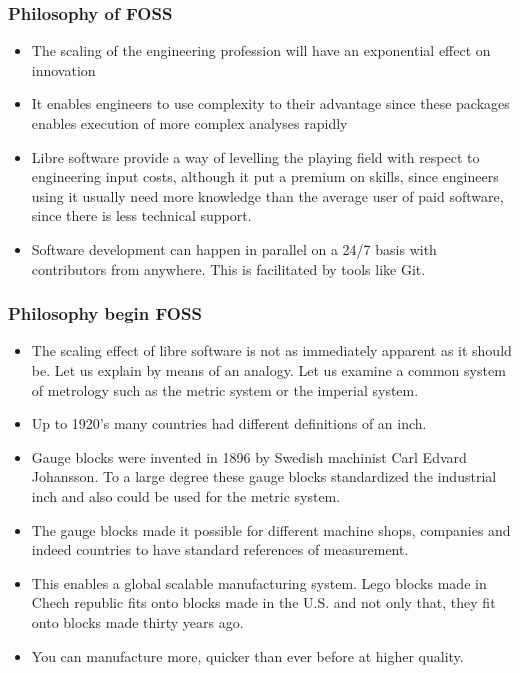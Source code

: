 \documentclass{beamer}
\begin{document}
\begin{frame}
\frametitle{Philosophy of FOSS}

\begin{itemize}
\item The scaling of the engineering profession will have an exponential effect on innovation
\item It enables engineers to use complexity to their advantage since these packages enables execution of more complex analyses rapidly
\item Libre software provide a way of levelling the playing field with respect to engineering input costs, although it put a premium on skills, since engineers using it usually need more knowledge than the average user of paid software, since there is less technical support.
\item Software development can happen in parallel on a 24/7 basis with contributors from anywhere.  This is facilitated by tools like Git.
\end{itemize}

\end{frame}




\begin{frame}
\frametitle{Philosophy begin FOSS}

\begin{itemize}
\item The scaling effect of libre software is not as immediately apparent as it should be.  Let us explain by means of an analogy.  Let us examine a common system of metrology such as the metric system or the imperial system.
\item Up to 1920's many countries had different definitions of an inch.
\item Gauge blocks were invented in 1896 by Swedish machinist Carl Edvard Johansson.  To a large degree these gauge blocks standardized the industrial inch and also could be used for the metric system.
\item The gauge blocks made it possible for different machine shops, companies and indeed countries to have standard references of measurement.
\item This enables a global scalable manufacturing system.  Lego blocks made in Chech republic fits onto blocks made in the U.S. and not only that, they fit onto blocks made thirty years ago.
\item You can manufacture more, quicker than ever before at higher quality.        
\end{itemize}


\end{frame}
\end{document}
